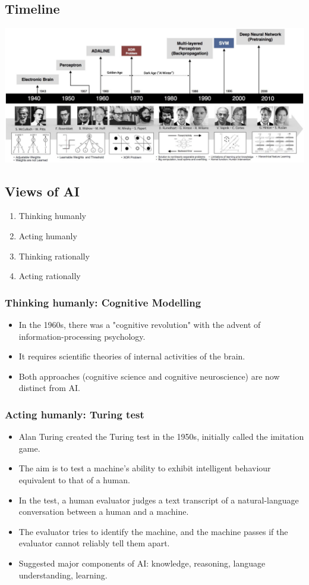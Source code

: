 \documentclass[11pt]{article}
\begin{document}
\subsection{Timeline}
\label{sec:org96495d8}
\begin{center}
\includegraphics[width=.9\linewidth]{./images/timeline-of-ai-development.png}
\end{center}
\subsection{Views of AI}
\label{sec:org53638ec}
\begin{enumerate}
\item Thinking humanly
\item Acting humanly
\item Thinking rationally
\item Acting rationally
\end{enumerate}
\subsubsection{Thinking humanly: Cognitive Modelling}
\label{sec:orgab681dc}
\begin{itemize}
\item In the 1960s, there was a "cognitive revolution" with the advent of information-processing psychology.
\item It requires scientific theories of internal activities of the brain.
\item Both approaches (cognitive science and cognitive neuroscience) are now distinct from AI.
\end{itemize}
\subsubsection{Acting humanly: Turing test}
\label{sec:orga0b734a}
\begin{itemize}
\item Alan Turing created the Turing test in the 1950s, initially called the imitation game.
\item The aim is to test a machine's ability to exhibit intelligent behaviour equivalent to that of a human.
\item In the test, a human evaluator judges a text transcript of a natural-language conversation between a human and a machine.
\item The evaluator tries to identify the machine, and the machine passes if the evaluator cannot reliably tell them apart.
\item Suggested major components of AI: knowledge, reasoning, language understanding, learning.
\end{itemize}
\end{document}
